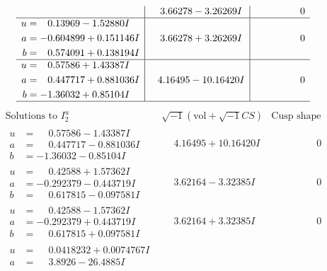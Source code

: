 \documentclass[1p]{elsarticle_modified}
\theoremstyle{definition}
\newcommand{\I}{\sqrt{-1}}
\begin{document}
$$\begin{array}{c|c|c}
 & \phantom{-}3.66278 - 3.26269 I & \phantom{-0.000000 } 0 \\ \hline\begin{aligned}
u &= \phantom{-}0.13969 - 1.52880 I \\
a &= -0.604899 + 0.151146 I \\
b &= \phantom{-}0.574091 + 0.138194 I\end{aligned}
 & \phantom{-}3.66278 + 3.26269 I & \phantom{-0.000000 } 0 \\ \hline\begin{aligned}
u &= \phantom{-}0.57586 + 1.43387 I \\
a &= \phantom{-}0.447717 + 0.881036 I \\
b &= -1.36032 + 0.85104 I\end{aligned}
 & \phantom{-}4.16495 - 10.16420 I & \phantom{-0.000000 } 0\\
 \hline 
 \end{array}$$\newpage$$\begin{array}{c|c|c}  
\text{Solutions to }I^u_{2}& \I (\text{vol} + \sqrt{-1}CS) & \text{Cusp shape}\\
 \hline 
\begin{aligned}
u &= \phantom{-}0.57586 - 1.43387 I \\
a &= \phantom{-}0.447717 - 0.881036 I \\
b &= -1.36032 - 0.85104 I\end{aligned}
 & \phantom{-}4.16495 + 10.16420 I & \phantom{-0.000000 } 0 \\ \hline\begin{aligned}
u &= \phantom{-}0.42588 + 1.57362 I \\
a &= -0.292379 - 0.443719 I \\
b &= \phantom{-}0.617815 - 0.097581 I\end{aligned}
 & \phantom{-}3.62164 - 3.32385 I & \phantom{-0.000000 } 0 \\ \hline\begin{aligned}
u &= \phantom{-}0.42588 - 1.57362 I \\
a &= -0.292379 + 0.443719 I \\
b &= \phantom{-}0.617815 + 0.097581 I\end{aligned}
 & \phantom{-}3.62164 + 3.32385 I & \phantom{-0.000000 } 0 \\ \hline\begin{aligned}
u &= \phantom{-}0.0418232 + 0.0074767 I \\
a &= \phantom{-}3.8926 - 26.4885 I \\

\end{aligned}
\end{array}$$
\end{document}
